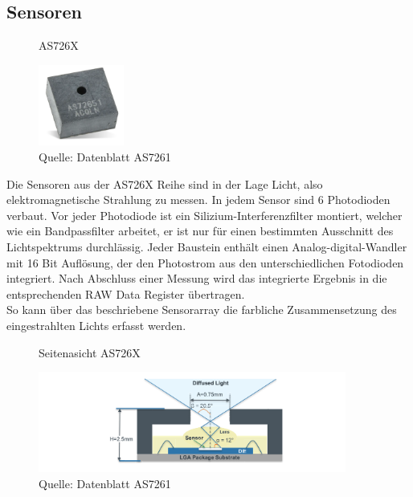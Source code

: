 \newpage
\subsection{Sensoren}\label{Sensoren}

\begin{figure}
\centering
\caption{AS726X}
\includegraphics[width=0.25\textwidth]{img/as726X.png}
 \caption*{Quelle: Datenblatt AS7261}
\label{fig:AS726X}
\end{figure}

Die Sensoren aus der AS726X Reihe sind in der Lage Licht, also elektromagnetische Strahlung zu messen. 
In jedem Sensor sind 6 Photodioden verbaut. 
Vor jeder Photodiode ist ein Silizium-Interferenzfilter montiert, welcher wie ein Bandpassfilter arbeitet, er ist nur für einen bestimmten Ausschnitt des Lichtspektrums durchlässig.
Jeder Baustein enthält einen Analog-digital-Wandler mit 16 Bit Auflösung, der den Photostrom aus den unterschiedlichen Fotodioden integriert. Nach Abschluss einer Messung wird das integrierte Ergebnis in die entsprechenden RAW Data Register übertragen.\\
So kann über das beschriebene Sensorarray die farbliche Zusammensetzung des eingestrahlten Lichts erfasst werden.

\begin{figure}[H]
\centering
\caption{Seitenasicht AS726X}
\includegraphics[width=0.9\textwidth]{img/AS726X-seitenansicht.png}
\caption*{Quelle: Datenblatt AS7261}
\label{fig:Seitenasicht-AS726X}
\end{figure}


